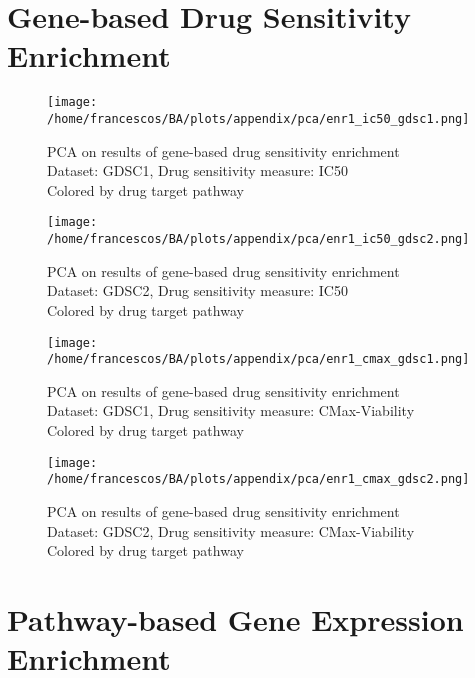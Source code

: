 \section{Gene-based Drug Sensitivity Enrichment}

\begin{figure}[H]
    \centering
    \texttt{[image: /home/francescos/BA/plots/appendix/pca/enr1\_ic50\_gdsc1.png]}
    \caption{PCA on results of gene-based drug sensitivity enrichment\\Dataset: GDSC1, Drug sensitivity measure: IC50\\Colored by drug target pathway}
\end{figure}
\begin{figure}[H]
    \centering
    \texttt{[image: /home/francescos/BA/plots/appendix/pca/enr1\_ic50\_gdsc2.png]}
    \caption{PCA on results of gene-based drug sensitivity enrichment\\Dataset: GDSC2, Drug sensitivity measure: IC50\\Colored by drug target pathway}
\end{figure}
\begin{figure}[H]
    \centering
    \texttt{[image: /home/francescos/BA/plots/appendix/pca/enr1\_cmax\_gdsc1.png]}
    \caption{PCA on results of gene-based drug sensitivity enrichment\\Dataset: GDSC1, Drug sensitivity measure: CMax-Viability\\Colored by drug target pathway}
\end{figure}
\begin{figure}[H]
    \centering
    \texttt{[image: /home/francescos/BA/plots/appendix/pca/enr1\_cmax\_gdsc2.png]}
    \caption{PCA on results of gene-based drug sensitivity enrichment\\Dataset: GDSC2, Drug sensitivity measure: CMax-Viability\\Colored by drug target pathway}
\end{figure}

\section{Pathway-based Gene Expression Enrichment}

